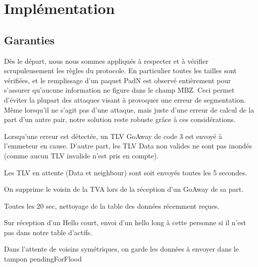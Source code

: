 \documentclass[11pt,a4paper]{article}
\begin{document}
\section{Implémentation}

\subsection{Garanties}

Dès le départ, nous nous sommes appliqués à respecter et à vérifier scrupuleusement les règles du protocole. En particulier toutes les tailles sont vérifiées, et le remplissage
d'un paquet PadN est observé entièrement pour s'assurer qu'aucune information ne figure dans le champ \f{MBZ}. Ceci permet d'éviter la plupart des attaques visant à provoquer 
une erreur de segmentation. Même lorsqu'il ne s'agit pas d'une attaque, mais juste d'une erreur de calcul de la part d'un autre pair, notre solution reste robuste grâce à
ces considérations.

Lorsqu'une erreur est détectée, un TLV GoAway de code 3 est envoyé à l'emmeteur en cause. D'autre part, les TLV Data non valides ne sont pas inondés (comme aucun TLV invalide 
n'est pris en compte).
	
	Les TLV en attente (Data et neighbour) sont soit envoyés toutes les 5 secondes.
	
	On supprime le voisin de la TVA lors de la réception d'un GoAway de sa part.
	
	Toutes les 20 sec, nettoyage de la table des données récemment reçues.
	
	Sur réception d'un Hello court, envoi d'un hello long à cette personne si il n'est pas dans notre table d'actifs.
	
	Dans l'attente de voisins symétriques, on garde les données à envoyer dans le tampon pendingForFlood
	
\end{document}
